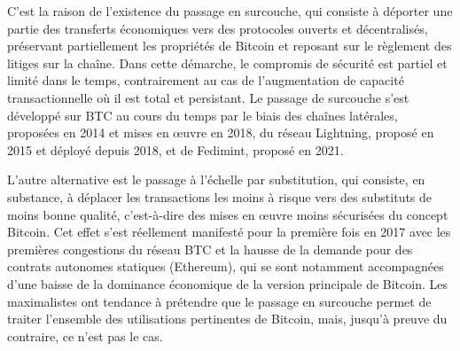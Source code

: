C'est la raison de l'existence du passage en surcouche, qui consiste à déporter une partie des transferts économiques vers des protocoles ouverts et décentralisés, préservant partiellement les propriétés de Bitcoin et reposant sur le règlement des litiges sur la chaîne. Dans cette démarche, le compromis de sécurité est partiel et limité dans le temps, contrairement au cas de l'augmentation de capacité transactionnelle où il est total et persistant. Le passage de surcouche s'est développé sur BTC au cours du temps par le biais des chaînes latérales, proposées en 2014 et mises en œuvre en 2018, du réseau Lightning, proposé en 2015 et déployé depuis 2018, et de Fedimint, proposé en 2021.

L'autre alternative est le passage à l'échelle par substitution, qui consiste, en substance, à déplacer les transactions les moins à risque vers des substituts de moins bonne qualité, c'est-à-dire des mises en œuvre moins sécurisées du concept Bitcoin. Cet effet s'est réellement manifesté pour la première fois en 2017 avec les premières congestions du réseau BTC et la hausse de la demande pour des contrats autonomes statiques (Ethereum), qui se sont notamment accompagnées d'une baisse de la dominance économique de la version principale de Bitcoin. Les maximalistes ont tendance à prétendre que le passage en surcouche permet de traiter l'ensemble des utilisations pertinentes de Bitcoin, mais, jusqu'à preuve du contraire, ce n'est pas le cas.
